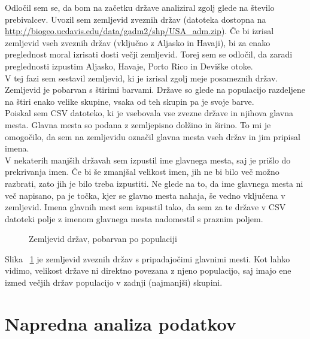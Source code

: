 \documentclass[11pt,a4paper]{article}
\begin{document}
Odločil sem se, da bom na začetku države analiziral zgolj glede na število prebivalcev. Uvozil sem zemljevid zveznih držav (datoteka dostopna na \url{http://biogeo.ucdavis.edu/data/gadm2/shp/USA_adm.zip}). Če bi izrisal zemljevid vseh zveznih držav (vključno z Aljasko in Havaji), bi za enako preglednost moral izrisati dosti večji zemljevid. Torej sem se odločil, da zaradi preglednosti izpustim Aljasko, Havaje, Porto Rico in Deviške otoke. \\
V tej fazi sem sestavil zemljevid, ki je izrisal zgolj meje posameznih držav.
Zemljevid je pobarvan s štirimi barvami. Države so glede na populacijo razdeljene na štiri enako velike skupine, vsaka od teh skupin pa je svoje barve.\\
Poiskal sem CSV datoteko, ki je vsebovala vse zvezne države in njihova glavna mesta. Glavna mesta so podana z zemljepisno dolžino in širino. To mi je omogočilo, da sem na zemljevidu označil glavna mesta vseh držav in jim pripisal imena. \\
V nekaterih manjših državah sem izpustil ime glavnega mesta, saj je prišlo do prekrivanja imen. Če bi še zmanjšal velikost imen, jih ne bi bilo več možno razbrati, zato jih je bilo treba izpustiti. Ne glede na to, da ime glavnega mesta ni več napisano, pa je točka, kjer se glavno mesta nahaja, še vedno vključena v zemljevid. Imena glavnih mest sem izpustil tako, da sem za te države v CSV datoteki polje z imenom glavnega mesta nadomestil s praznim poljem.

\begin{figure}[H]
  \caption{Zemljevid držav, pobarvan po populaciji}
  \label{fig:Zemljevid 1}
\end{figure}

Slika ~\ref{fig:Zemljevid 1} je zemljevid zveznih držav s pripadajočimi glavnimi mesti. Kot lahko vidimo, velikost države ni direktno povezana z njeno populacijo, saj imajo ene izmed večjih držav populacijo v zadnji (najmanjši) skupini.

\pagebreak
\section{Napredna analiza podatkov}
\end{document}

